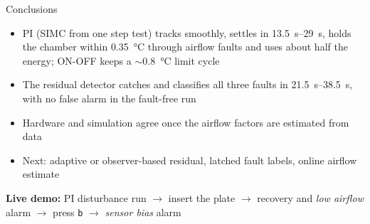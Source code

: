 \documentclass[aspectratio=169,10pt]{beamer}
\begin{document}
\begin{frame}{Conclusions}
\begin{itemize}
\item PI (SIMC from one step test) tracks smoothly, settles in \SIrange{13.5}{29}{s}, holds the chamber
within \SI{0.35}{\celsius} through airflow faults and uses about half the energy; ON-OFF keeps a
\(\sim\)\SI{0.8}{\celsius} limit cycle
\item The residual detector catches and classifies all three faults in \SIrange{21.5}{38.5}{s},
with no false alarm in the fault-free run
\item Hardware and simulation agree once the airflow factors are estimated from data
\item Next: adaptive or observer-based residual, latched fault labels, online airflow estimate
\end{itemize}
\vspace{5mm}
\centering
\textbf{Live demo:} PI disturbance run \(\to\) insert the plate \(\to\) recovery and \emph{low airflow} alarm
\(\to\) press \texttt{b} \(\to\) \emph{sensor bias} alarm
\end{frame}
\end{document}
